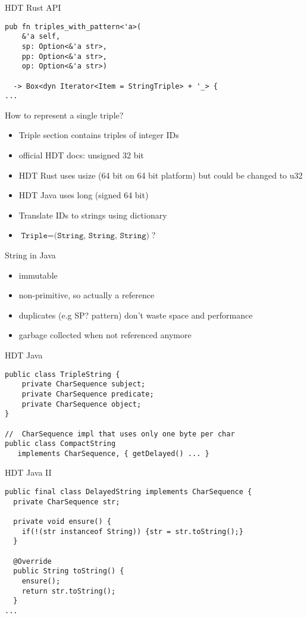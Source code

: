 \documentclass[14pt,aspectratio=169]{beamer}
\newcommand\pro{\item[$+$]}
\begin{document}
\begin{frame}[fragile]{HDT Rust API}
\small
\begin{verbatim}
pub fn triples_with_pattern<'a>(
    &'a self,
    sp: Option<&'a str>,
    pp: Option<&'a str>,
    op: Option<&'a str>)

  -> Box<dyn Iterator<Item = StringTriple> + '_> {
...
\end{verbatim}
\end{frame}

\begin{frame}{How to represent a single triple?}
\centering
{}\\
\begin{itemize}
\item Triple section contains triples of integer IDs
\item official HDT docs: unsigned 32 bit
\item HDT Rust uses usize (64 bit on 64 bit platform) but could be changed to u32
\item HDT Java uses long (signed 64 bit)
\item Translate IDs to strings using dictionary
\item $\texttt{Triple} = \texttt{(String, String, String)}$?
\end{itemize}
\end{frame}

\begin{frame}{String in Java}
\begin{itemize}
\pro immutable
\pro non-primitive, so actually a reference
\pro duplicates (e.g SP? pattern) don't waste space and performance
\pro garbage collected when not referenced anymore
\end{itemize}
\end{frame}

\begin{frame}[fragile]{HDT Java}
\small
\begin{verbatim}
public class TripleString {
    private CharSequence subject;
    private CharSequence predicate;
    private CharSequence object;
}

//  CharSequence impl that uses only one byte per char
public class CompactString
   implements CharSequence, { getDelayed() ... }
\end{verbatim}
\end{frame}

\begin{frame}[fragile]{HDT Java II}
\small
\begin{verbatim}
public final class DelayedString implements CharSequence {
  private CharSequence str;

  private void ensure() {
    if(!(str instanceof String)) {str = str.toString();}
  }

  @Override
  public String toString() {
    ensure();
    return str.toString();
  }
...
\end{verbatim}
\end{frame}
\end{document}

